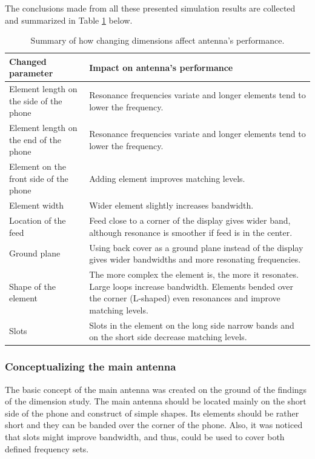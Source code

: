 The conclusions made from all these presented simulation results are collected and summarized in Table \ref{tab:dimension_summary} below. 

\begin{table}[H]
    \centering
    \caption{Summary of how changing dimensions affect antenna's performance.}
    \label{tab:dimension_summary}
    \begin{tabular}{|p{}|p{}|}
        \hline
        \textbf{Changed parameter} & \textbf{Impact on antenna's performance} \\
        \hline
        Element length on the side of the phone & Resonance frequencies variate and longer elements tend to lower the frequency.\\
        \hline
        Element length on the end of the phone & Resonance frequencies variate and longer elements tend to lower the frequency.\\
        \hline
        Element on the front side of the phone & Adding element improves matching levels.\\
        \hline
        Element width & Wider element slightly increases bandwidth.\\
        \hline
        Location of the feed & Feed close to a corner of the display gives wider band, although resonance is smoother if feed is in the center.\\
        \hline
        Ground plane & Using back cover as a ground plane instead of the display gives wider bandwidths and more resonating frequencies.\\
        \hline
        Shape of the element & The more complex the element is, the more it resonates. Large loops increase bandwidth. Elements bended over the corner (L-shaped) even resonances and improve matching levels.\\
        \hline
        Slots & Slots in the element on the long side narrow bands and on the short side decrease matching levels.\\
        \hline
    \end{tabular}
\end{table} 

\subsubsection{Conceptualizing the main antenna}
\label{sec:conceptualizing}

The basic concept of the main antenna was created on the ground of the findings of the dimension study. The main antenna should be located mainly on the short side of the phone and construct of simple shapes. Its elements should be rather short and they can be banded over the corner of the phone. Also, it was noticed that slots might improve bandwidth, and thus, could be used to cover both defined frequency sets. 

